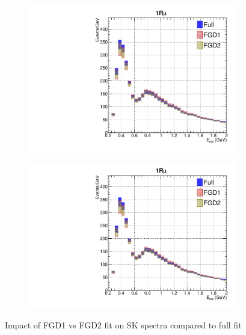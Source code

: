 \begin{figure}[h]
	\begin{subfigure}[t]{0.32\textwidth}
		\includegraphics[width=\textwidth, trim={0mm 0mm 0mm 0mm}, clip, page=4]{figures/mach3/data/alt/try_2017_fit_on_sk_spectra_posterior_sk_error_fgd1only_spectra_posterior_sk_error_fgd2only_spectra}
	\end{subfigure}
	\begin{subfigure}[t]{0.32\textwidth}
		\includegraphics[width=\textwidth, trim={0mm 0mm 0mm 0mm}, clip, page=5]{figures/mach3/data/alt/try_2017_fit_on_sk_spectra_posterior_sk_error_fgd1only_spectra_posterior_sk_error_fgd2only_spectra}
	\end{subfigure}
	\caption{Impact of FGD1 vs FGD2 fit on SK spectra compared to full fit}
	\label{fig:sk_fgd1vsfgd2}
\end{figure}

